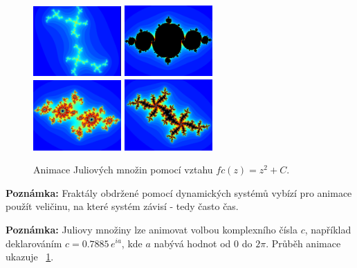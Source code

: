 \documentclass[thesis=B, czech]{FITthesis}[2019/03/06]
\newcommand{\note}[1]{\begin{noteBox} \textbf{Poznámka:} #1 \end{noteBox}}
\begin{document}
\begin{figure}[h]
    \centering
    \noindent
    \includegraphics[width=0.3\textwidth]{images/julia1.png}\hspace{0.05\textwidth}%
    \includegraphics[width=0.3\textwidth]{images/julia35.png}\\[1em]
    \includegraphics[width=0.3\textwidth]{images/julia36.png}\hspace{0.05\textwidth}%
    \includegraphics[width=0.3\textwidth]{images/julia4.png}\par
    \caption{Animace Juliových množin pomocí vztahu $fc(z)=z^2+C$.}
    \label{fig:julia}
\end{figure}

\note{Fraktály obdržené pomocí dynamických systémů vybízí pro animace použít veličinu, na které systém závisí - tedy často čas.}

\note{Juliovy množiny lze animovat volbou komplexního čísla $c$, například deklarováním $c = 0.7885\,e^{ia}$, kde $a$ nabývá hodnot od $0$ do $2\pi$. Průběh animace ukazuje \figurename~\ref{fig:julia}.}
\end{document}
